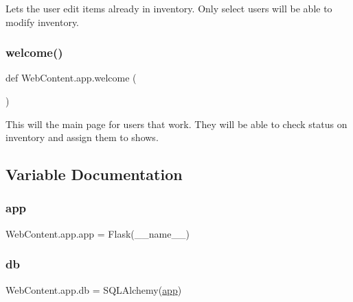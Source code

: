 \begin{DoxyVerb}Lets the user edit items already in inventory.
Only select users will be able to modify inventory.
\end{DoxyVerb}
 \mbox{\label{namespace_web_content_1_1app_ac220a4f6d552ae239a9fe5a933eb4c0d}} 
\subsubsection{\texorpdfstring{welcome()}{welcome()}}
{\footnotesize\ttfamily def Web\+Content.\+app.\+welcome (\begin{DoxyParamCaption}{ }\end{DoxyParamCaption})}

\begin{DoxyVerb}This will the main page for users
that work. They will be able to check status on inventory
and assign them to shows.
\end{DoxyVerb}
 

\subsection{Variable Documentation}
\mbox{\label{namespace_web_content_1_1app_a52716e6e08bae668f90c903a1f4e2f10}} 
\subsubsection{\texorpdfstring{app}{app}}
{\footnotesize\ttfamily Web\+Content.\+app.\+app = Flask(\+\_\+\+\_\+name\+\_\+\+\_\+)}

\mbox{\label{namespace_web_content_1_1app_a317646b91bdcf24c176d3bfc065083f3}} 
\subsubsection{\texorpdfstring{db}{db}}
{\footnotesize\ttfamily Web\+Content.\+app.\+db = S\+Q\+L\+Alchemy(\hyperlink{namespace_web_content_1_1app_a52716e6e08bae668f90c903a1f4e2f10}{app})}

